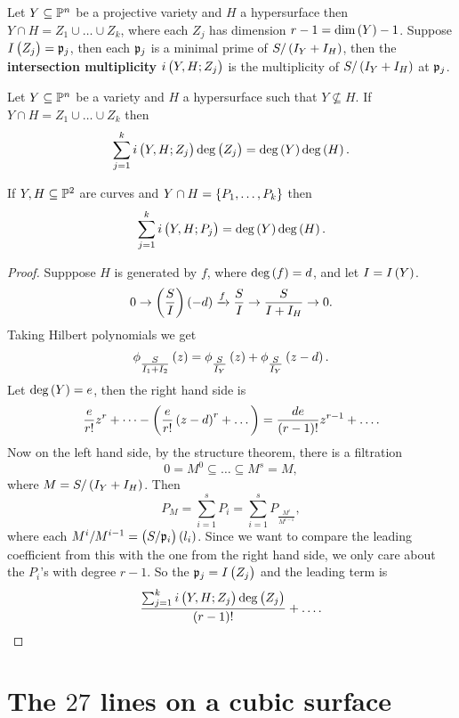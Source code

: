 \pagebreak


Let $ Y \subseteq \P^n $ be a projective variety and $ H $ a hypersurface then $ Y \cap H = Z_1 \cup \dots \cup Z_k $, where each $ Z_j $ has dimension $ r - 1 = \dim\br{Y} - 1 $. Suppose $ I\br{Z_j} = \pp_j $, then each $ \pp_j $ is a minimal prime of $ S / \br{I_Y + I_H} $, then the \textbf{intersection multiplicity} $ i\br{Y, H; Z_j} $ is the multiplicity of $ S / \br{I_Y + I_H} $ at $ \pp_j $.

\begin{theorem}
Let $ Y \subseteq \P^n $ be a variety and $ H $ a hypersurface such that $ Y \nsubseteq H $. If $ Y \cap H = Z_1 \cup \dots \cup Z_k $ then
$$ \sum_{j = 1}^k i\br{Y, H; Z_j}\deg\br{Z_j} = \deg\br{Y}\deg\br{H}. $$
\end{theorem}

\begin{corollary}
If $ Y, H \subseteq \P^2 $ are curves and $ Y \cap H = \cbr{P_1, \dots, P_k} $ then
$$ \sum_{j = 1}^k i\br{Y, H; P_j} = \deg\br{Y}\deg\br{H}. $$
\end{corollary}

\begin{proof}
Supppose $ H $ is generated by $ f $, where $ \deg\br{f} = d $, and let $ I = I\br{Y} $.
$$ 0 \to \br{\dfrac{S}{I}}\br{-d} \xrightarrow{f} \dfrac{S}{I} \to \dfrac{S}{I + I_H} \to 0. $$
Taking Hilbert polynomials we get
$$ \phi_{\tfrac{S}{I_1 + I_2}}\br{z} = \phi_{\tfrac{S}{I_Y}}\br{z} + \phi_{\tfrac{S}{I_Y}}\br{z - d}. $$
Let $ \deg\br{Y} = e $, then the right hand side is
$$ \dfrac{e}{r!}z^r + \dots - \br{\dfrac{e}{r!}\br{z - d}^r + \dots} = \dfrac{de}{\br{r - 1}!}z^{r - 1} + \dots. $$
Now on the left hand side, by the structure theorem, there is a filtration
$$ 0 = M^0 \subseteq \dots \subseteq M^s = M, $$
where $ M = S / \br{I_Y + I_H} $. Then
$$ P_M = \sum_{i = 1}^s P_i = \sum_{i = 1}^s P_{\tfrac{M^i}{M^{i - 1}}}, $$
where each $ M^i / M^{i - 1} = \br{S / \pp_i}\br{l_i} $. Since we want to compare the leading coefficient from this with the one from the right hand side, we only care about the $ P_i $'s with degree $ r - 1 $. So the $ \pp_j = I\br{Z_j} $ and the leading term is
$$ \dfrac{\sum_{j = 1}^k i\br{Y, H; Z_j}\deg\br{Z_j}}{\br{r - 1}!} + \dots. $$
\end{proof}

\pagebreak

\section{The $ 27 $ lines on a cubic surface}

